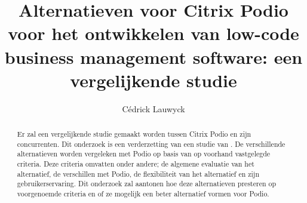 \documentclass{hogent-article}
\title{Alternatieven voor Citrix Podio voor het ontwikkelen van low-code business management software: een vergelijkende studie}
\author{Cédrick Lauwyck}
\begin{document}
\begin{abstract}
Er zal een vergelijkende studie gemaakt worden tussen Citrix Podio en zijn concurrenten. Dit onderzoek is een verderzetting van een studie van \textcite{Spitaels2022}. De verschillende alternatieven worden vergeleken met Podio op basis van op voorhand vastgelegde criteria. Deze criteria omvatten onder andere; de algemene evaluatie van het alternatief, de verschillen met Podio, de flexibiliteit van het alternatief en zijn gebruikerservaring. Dit onderzoek zal aantonen hoe deze alternatieven presteren op voorgenoemde criteria en of ze mogelijk een beter alternatief vormen voor Podio.
\end{abstract}

\tableofcontents



\printbibliography[heading=bibintoc]
\end{document}
